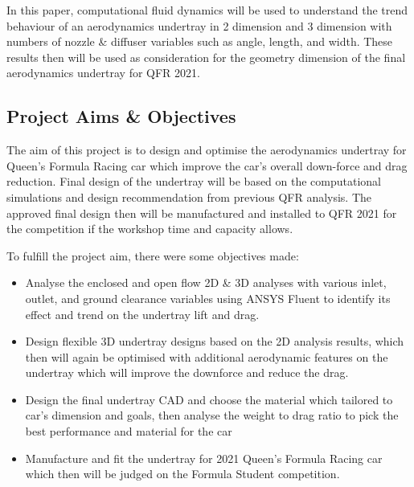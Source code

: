 \noindent In this paper, computational fluid dynamics will be used to understand the trend behaviour of an aerodynamics undertray in 2 dimension and 3 dimension with numbers of nozzle \& diffuser variables such as angle, length, and width. These results then will be used as consideration for the geometry dimension of the final aerodynamics undertray for QFR 2021.

\subsection{Project Aims \& Objectives}
The aim of this project is to design and optimise the aerodynamics undertray for Queen's Formula Racing car which improve the car's overall down-force and drag reduction. Final design of the undertray will be based on the computational simulations and design recommendation from previous QFR analysis. The approved final design then will be manufactured and installed to QFR 2021 for the competition if the workshop time and capacity allows.

\noindent
To fulfill the project aim, there were some objectives made:
\begin{itemize}
    \item Analyse the enclosed and open flow 2D \& 3D analyses with various inlet, outlet, and ground clearance variables  using ANSYS Fluent to identify its effect and trend on the undertray lift and drag. 
    \item Design flexible 3D undertray designs based on the 2D analysis results, which then will again be optimised with additional aerodynamic features on the undertray which will improve the downforce and reduce the drag.
	\item Design the final undertray CAD and choose the material which tailored to car’s dimension and goals, then analyse the weight to drag ratio to pick the best performance and material for the car
    \item Manufacture and fit the undertray for 2021 Queen’s Formula Racing car which then will be judged on the Formula Student competition.
\end{itemize}